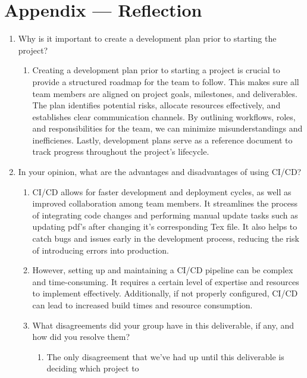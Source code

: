 \documentclass{article}
\begin{document}
\newpage{}

\section*{Appendix --- Reflection}




\begin{enumerate}
    \item Why is it important to create a development plan prior to starting the
    project?
    \begin{enumerate}
      \item Creating a development plan prior to starting a project is crucial to provide a 
      structured roadmap for the team to follow. This makes sure all team members are aligned on 
      project goals, milestones, and deliverables. The plan identifies potential risks, allocate resources
      effectively, and establishes clear communication channels. By outlining workflows, roles, 
      and responsibilities for the team, we can minimize misunderstandings and inefficienes. Lastly, 
      development plans serve as a reference document to track progress throughout the project's lifecycle.
    \end{enumerate}
    \item In your opinion, what are the advantages and disadvantages of using
    CI/CD?
    \begin{enumerate}
        \item CI/CD allows for faster development and deployment cycles, as well as
        improved collaboration among team members. It streamlines the process of integrating code changes and performing manual update tasks such as updating pdf's after changing it's corresponding Tex file.
        It also helps to catch bugs and issues early in the development process, reducing the risk of introducing errors into production.
        \item However, setting up and maintaining a CI/CD pipeline can be complex and time-consuming. It requires a certain level of expertise and resources to implement effectively. Additionally, if not properly configured, CI/CD can lead to increased build times and resource consumption.
    \item What disagreements did your group have in this deliverable, if any,
    and how did you resolve them?
      \begin{enumerate}
        \item The only disagreement that we've had up until this deliverable is deciding which project to 

\end{enumerate}
\end{enumerate}
\end{enumerate}
\end{document}
